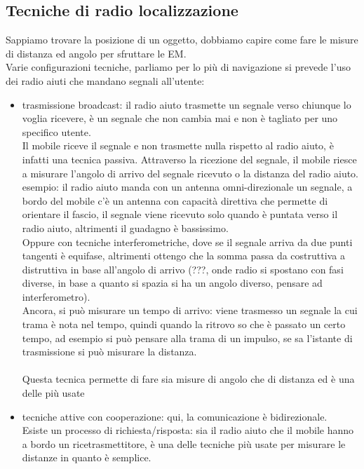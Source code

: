 \documentclass[oneside, 12pt]{extbook}
\begin{document}
\subsection{Tecniche di radio localizzazione}
Sappiamo trovare la posizione di un oggetto, dobbiamo capire come fare le misure di distanza ed angolo per sfruttare le EM.\\
Varie configurazioni tecniche, parliamo per lo più di navigazione si prevede l'uso dei radio aiuti che mandano segnali all'utente:
\begin{itemize}
	\item trasmissione broadcast: il radio aiuto trasmette un segnale verso chiunque lo voglia ricevere, è un segnale che non cambia mai e non è tagliato per uno specifico utente.\\
	Il mobile riceve il segnale e non trasmette nulla rispetto al radio aiuto, è infatti una tecnica passiva. Attraverso la ricezione del segnale, il mobile riesce a misurare l'angolo di arrivo del segnale ricevuto o la distanza del radio aiuto.\\
	esempio: il radio aiuto manda con un antenna omni-direzionale un segnale, a bordo del mobile c'è un antenna con capacità direttiva che permette di orientare il fascio, il segnale viene ricevuto solo quando è puntata verso il radio aiuto, altrimenti il guadagno è bassissimo.\\
	Oppure con tecniche interferometriche, dove se il segnale arriva da due punti tangenti è equifase, altrimenti ottengo che la somma passa da costruttiva a distruttiva in base all'angolo di arrivo (???, onde radio si spostano con fasi diverse, in base a quanto si spazia si ha un angolo diverso, pensare ad interferometro).\\
	Ancora, si può misurare un tempo di arrivo: viene trasmesso un segnale la cui trama è nota nel tempo, quindi quando la ritrovo so che è passato un certo tempo, ad esempio si può pensare alla trama di un impulso, se sa l'istante di trasmissione si può misurare la distanza.\\\\
	Questa tecnica permette di fare sia misure di angolo che di distanza ed è una delle più usate
	\item tecniche attive con cooperazione: qui, la comunicazione è bidirezionale.\\
	Esiste un processo di richiesta/risposta: sia il radio aiuto che il mobile hanno a bordo un ricetrasmettitore, è una delle tecniche più usate per misurare le distanze in quanto è semplice.\\

\end{itemize}
\end{document}
